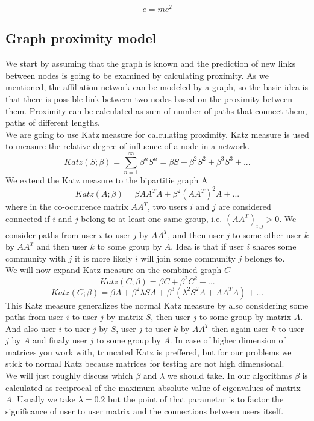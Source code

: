 \documentclass[twoside,twocolumn]{article}
\begin{document}
\blindtext %

\begin{equation}
\label{eq:emc}
e = mc^2
\end{equation}

\blindtext %

\subsection{Graph proximity model}
We start by assuming that the graph is known and the prediction of new links between nodes is going to be examined by calculating proximity. As we mentioned, the affiliation network can be modeled by a graph, so the basic idea is that there is possible link between two nodes based on the proximity between them. Proximity can be calculated as sum of number of paths  that connect them, paths of different lengths. \\
We are going to use Katz measure for calculating proximity. Katz measure is used to measure the relative degree of influence of a node in a network.
\[ Katz(S;\beta) = \sum_{n=1}^{\infty} \beta^n S^n = \beta S +\beta^2 S^2 + \beta^3 S^3 + ...  \]
We extend the Katz measure to the bipartitie graph A
\[ Katz(A;\beta) = \beta A A^T A +\beta^2 (AA^T)^2 A + ...  \]
where in the co-occurence matrix $A A^T$, two users $i$ and $j$ are considered connected if $i$ and $j$ belong to at least one same group, i.e. $(AA^T)_{i,j} > 0$. We consider paths from user $i$ to user $j$ by $AA^T$, and then user $j$ to some other user $k$ by $AA^T$ and then user $k$ to some group by $A$. Idea is that if user $i$ shares some community with $j$ it is more likely $i$ will join some community $j$ belongs to. \\
We will now expand Katz measure on the combined graph $C$
\[ Katz(C;\beta) = \beta C +\beta^2 C^2 + ...  \]
\[ Katz(C;\beta) = \beta A +\beta^2 \lambda S A +  \beta^3( \lambda^2 S^2A + A A^T A ) + ...  \]
This Katz measure generalizes the normal Katz measure by also considering some paths from user $i$ to user $j$ by matrix $S$, then user $j$ to some group by matrix $A$. And also user $i$ to user $j$ by $S$, user $j$ to user $k$ by $AA^T$ then again user $k$ to user $j$ by $A$ and finaly user $j$ to some group by $A$. 
In case of higher dimension of matrices you work with, truncated Katz is preffered, but for our problems we stick to normal Katz because matrices for testing are not high dimensional. \\
We will just roughly discuss which $\beta$ and $\lambda$ we should take. In our algorithms $\beta$ is calculated as reciprocal of the maximum absolute value of eigenvalues of matrix $A$. Usually we take $\lambda = 0.2$ but the point of that parametar is to factor the significance of user to user matrix and the connections between users itself. 
\end{document}
